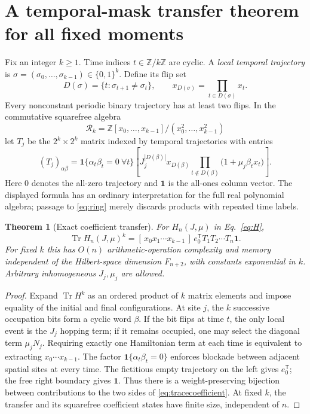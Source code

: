 \documentclass[10pt,a4paper]{article}
\newtheorem{theorem}{Theorem}[section]
\newcommand{\Tr}{\operatorname{Tr}}
\newcommand{\coef}[1]{[\, #1\,]}
\begin{document}
\section{A temporal-mask transfer theorem for all fixed moments}
Fix an integer $k\ge1$. Time indices $t\in\mathbb Z/k\mathbb Z$ are cyclic. A \emph{local temporal trajectory} is $\sigma=(\sigma_0,\ldots,\sigma_{k-1})\in\{0,1\}^k$. Define its flip set
\begin{equation}\label{eq:flip}
D(\sigma)=\{t:\sigma_{t+1}\ne\sigma_t\},\qquad
x_{D(\sigma)}=\prod_{t\in D(\sigma)}x_t.
\end{equation}
Every nonconstant periodic binary trajectory has at least two flips. In the commutative squarefree algebra
\begin{equation}\label{eq:ring}
\mathcal R_k=\mathbb Z[x_0,\ldots,x_{k-1}]/(x_0^2,\ldots,x_{k-1}^2)
\end{equation}
let $T_j$ be the $2^k\times 2^k$ matrix indexed by temporal trajectories with entries
\begin{equation}\label{eq:transfer}
(T_j)_{\alpha\beta}
=\boldsymbol1\{\alpha_t\beta_t=0\ \forall t\}
\left[J_j^{|D(\beta)|}x_{D(\beta)}
\prod_{t\notin D(\beta)}\bigl(1+\mu_j\beta_t x_t\bigr)\right].
\end{equation}
Here $0$ denotes the all-zero trajectory and $\boldsymbol1$ is the all-ones column vector. The displayed formula has an ordinary interpretation for the full real polynomial algebra; passage to \eqref{eq:ring} merely discards products with repeated time labels.

\begin{theorem}[Exact coefficient transfer]\label{th:transfer}
For $H_n(J,\mu)$ in Eq.~\eqref{eq:H},
\begin{equation}\label{eq:tracecoefficient}
\boxed{\Tr H_n(J,\mu)^k
=\coef{x_0x_1\cdots x_{k-1}}
\,e_{0}^{\mathsf T}T_1T_2\cdots T_n\boldsymbol1.}
\end{equation}
For fixed $k$ this has $O(n)$ arithmetic-operation complexity and memory independent of the Hilbert-space dimension $F_{n+2}$, with constants exponential in $k$. Arbitrary inhomogeneous $J_j,\mu_j$ are allowed.
\end{theorem}
\begin{proof}
Expand $\Tr H^k$ as an ordered product of $k$ matrix elements and impose equality of the initial and final configurations. At site $j$, the $k$ successive occupation bits form a cyclic word $\beta$. If the bit flips at time $t$, the only local event is the $J_j$ hopping term; if it remains occupied, one may select the diagonal term $\mu_jN_j$. Requiring exactly one Hamiltonian term at each time is equivalent to extracting $x_0\cdots x_{k-1}$. The factor $\boldsymbol1\{\alpha_t\beta_t=0\}$ enforces blockade between adjacent spatial sites at every time. The fictitious empty trajectory on the left gives $e_0^{\mathsf T}$; the free right boundary gives $\boldsymbol1$. Thus there is a weight-preserving bijection between contributions to the two sides of \eqref{eq:tracecoefficient}. At fixed $k$, the transfer and its squarefree coefficient states have finite size, independent of $n$.
\end{proof}
\end{document}

